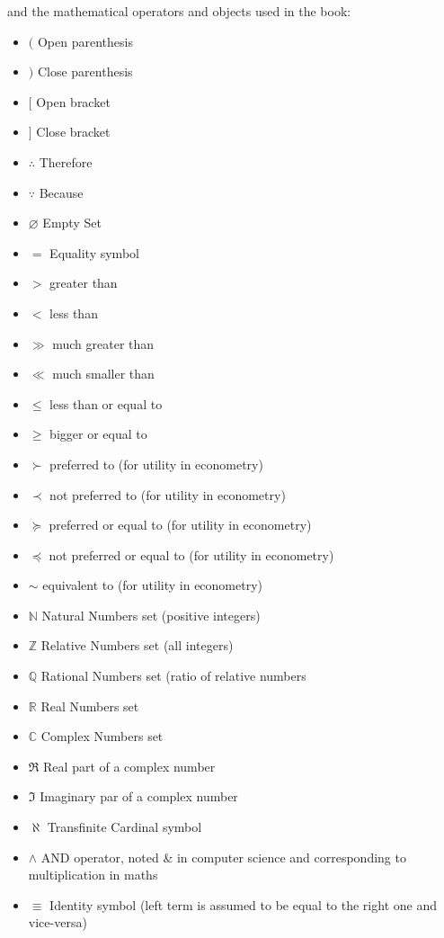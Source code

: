 \documentclass[12pt,a4paper,twoside,openright]{report}
\theoremstyle{definition}
\theoremstyle{itexmp}
\numberwithin{equation}{section}
\begin{document}
	and the mathematical operators and objects used in the book:
	\begin{itemize}[label={},leftmargin=0.5cm]
		\setlength{\itemsep}{1pt}
  		\item $($ Open parenthesis
  		\item $)$ Close parenthesis
  		\item $[$ Open bracket
  		\item $]$ Close bracket
  		\item $\therefore$ Therefore
  		\item $\because$ Because
	 	\item $\varnothing$ Empty Set
	 	\item $=$ Equality symbol
	 	\item $>$ greater than
	 	\item $<$ less than
	 	\item $\gg$ much greater than
	 	\item $\ll$ much smaller than
	 	\item $\leq$ less than or equal to
	 	\item $\geq$ bigger or equal to
	 	\item $\succ$ preferred to (for utility in econometry)
	 	\item $\prec$ not preferred to (for utility in econometry)
	 	\item $\succeq$ preferred or equal to (for utility in econometry)
	 	\item $\preceq$ not preferred or equal to (for utility in econometry)
	 	\item $\sim$ equivalent to (for utility in econometry)
	 	\item $\mathbb{N}$ Natural Numbers set (positive integers)
	 	\item $\mathbb{Z}$ Relative Numbers set (all integers)
	 	\item $\mathbb{Q}$ Rational Numbers set (ratio of relative numbers
	 	\item $\mathbb{R}$ Real Numbers set
	 	\item $\mathbb{C}$ Complex Numbers set
	 	\item $\Re$ Real part of a complex number
	 	\item $\Im$ Imaginary par of a complex number
	 	\item $\aleph$ Transfinite Cardinal symbol
	 	\item $\wedge$ AND operator, noted \& in computer science and corresponding to multiplication in maths
	 	\item $\equiv$ Identity symbol (left term is assumed to be equal to the right one and vice-versa)

\end{itemize}
\end{document}
